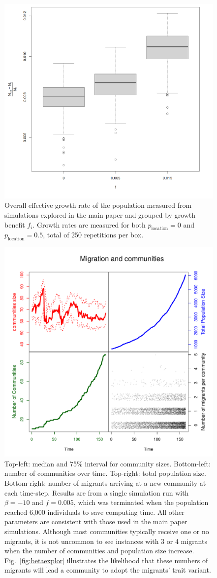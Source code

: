 \documentclass[9pt,twoside,lineno]{pnas-new}
\begin{document}
\begin{figure} %
    \centering
    \includegraphics[width=.7\textwidth]{FigsSM/growth_rate_experiments.png}
    \caption{Overall effective growth rate of the population measured from simulations explored in the main paper and grouped by growth benefit $f_i$. Growth rates are measured for both $p_\text{location}=0$  and $p_\text{location}=0.5$, total of 250 repetitions per box. }
    \label{fig:general-growth-rate}
\end{figure}

\begin{figure} %
    \centering
    \includegraphics[width=.7\textwidth]{FigsSM/migrantcount.pdf}
    \caption{Top-left: median and 75\% interval for community sizes. Bottom-left: number of communities over time. Top-right: total population size. Bottom-right: number of migrants arriving at a new community at each time-step. Results are from a single simulation run with $\beta=-10$ and $f=0.005$, which was terminated when the population reached 6,000 individuals to save computing time. All other parameters are consistent with those used in the main paper simulations. Although most communities typically receive one or no migrants, it is not uncommon to see instances with 3 or 4 migrants when the number of communities and population size increase. Fig.~\ref{fig:betaexplor} illustrates the likelihood that these numbers of migrants will lead a community to adopt the migrants' trait variant.}

    \label{fig:migrantcount}
\end{figure}
\end{document}
